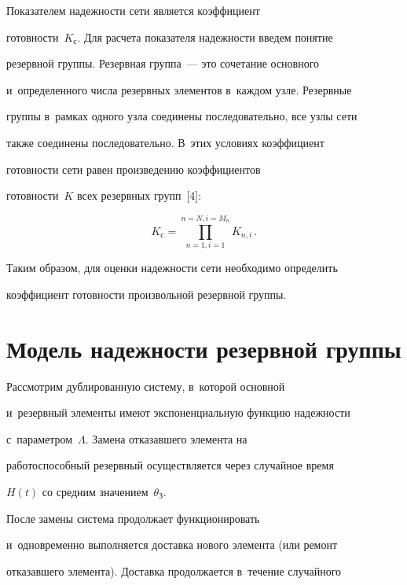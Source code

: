    


   Показателем надежности сети является коэффициент 


готовности~$K_{\mathrm{с}}$. Для расчета показателя надежности введем понятие 


резервной группы. Резервная группа~--- это сочетание основного 


и~определенного числа резервных элементов в~каждом узле. Резервные 


группы в~рамках одного узла соединены последовательно, все узлы сети 


также соединены последовательно. В~этих условиях коэффициент 


го\-тов\-ности сети равен произведению коэффициентов 


го\-тов\-ности~$K$ всех резервных групп~[4]:


   $$


   K_{\mathrm{с}}= \prod\limits_{n=1, i=1}^{n=N, i=M_n} K_{n,i}\,.


   $$


   


   Таким образом, для оценки надежности сети необходимо определить 


коэффициент готовности произвольной резервной группы.


   


   \section{Модель надежности резервной группы}


   


   Рассмотрим дублированную систему, в~которой основной 


   и~резервный элементы имеют экспоненциальную функцию надежности 


с~параметром~$\Lambda$. Замена отказавшего элемента на 


работоспособный резервный осуществляется через случайное время 


$H(t)$ со средним значением~$\theta_{\mathrm{З}}$.


   


   После замены система продолжает функционировать 


   и~одновременно выполняется доставка нового элемента (или ремонт 


отказавшего элемента). Доставка продолжается в~течение случайного 


